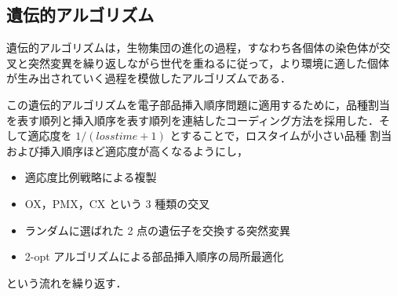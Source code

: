 \documentclass[a4j]{jarticle}
\begin{document}
\begin{Abstract}
 \section{遺伝的アルゴリズム}
 遺伝的アルゴリズムは，生物集団の進化の過程，すなわち各個体の染色体が交
 叉と突然変異を繰り返しながら世代を重ねるに従って，より環境に適した個体
 が生み出されていく過程を模倣したアルゴリズムである．

 この遺伝的アルゴリズムを電子部品挿入順序問題に適用するために，品種割当
 を表す順列と挿入順序を表す順列を連結したコーディング方法を採用した．そ
 して適応度を $1 / (losstime + 1)$ とすることで，ロスタイムが小さい品種
 割当および挿入順序ほど適応度が高くなるようにし，
 \begin{itemize} \vspace*{-1zh}
  \item 適応度比例戦略による複製 \vspace*{-1zh}
  \item OX，PMX，CX という 3 種類の交叉 \vspace*{-1zh}
  \item ランダムに選ばれた 2 点の遺伝子を交換する突然変異 \vspace*{-1zh}
  \item 2-opt アルゴリズムによる部品挿入順序の局所最適化 \vspace*{-1zh}
 \end{itemize}
 という流れを繰り返す．
 

\end{Abstract}
\end{document}
